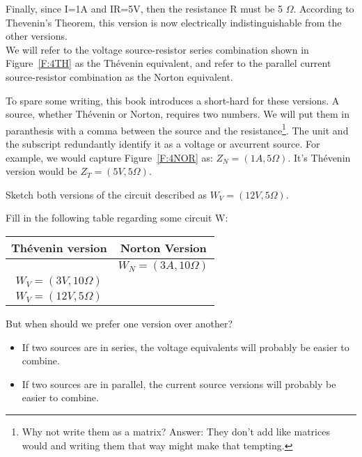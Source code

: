 Finally, since I=1A and IR=5V, then the resistance R must be 5 $\Omega$. According to Thevenin's Theorem, this version is now electrically indistinguishable from the other versions.
\\

We will refer to the voltage source-resistor series combination shown in Figure~\ref{F:4TH} as the Th\'{e}venin equivalent, and refer to the parallel current source-resistor combination as the Norton equivalent. 
\par
To spare some writing, this book introduces a short-hard for these versions. A source, whether Th\'{e}venin or Norton, requires two numbers. We will put them in paranthesis with a comma between the source and the resistance\footnote{Why not write them as a matrix? Answer: They don't add like matrices would and writing them that way might make that tempting.}. The unit and the subscript redundantly identify it as a voltage or avcurrent source. For example, we would capture Figure~\ref{F:4NOR} as: $Z_N=(1A,5\Omega)$. It's Th\'{e}venin version would be $Z_T=(5V,5\Omega)$.
\par
\begin{alevel}
Sketch both versions of the circuit described as $W_V=(12V,5\Omega)$. 
\end{alevel}

\begin{blevel}
Fill in the following table regarding some circuit W:
\begin{table}[H]
\begin{center}
\begin{tabular}{|c|c|} \hline
Th\'{e}venin version & Norton Version \\ \hline
&$W_N=(3A,10\Omega)$ \\ \hline
$W_V=(3V,10\Omega)$& \\ \hline
$W_V=(12V,5\Omega)$& \\ \hline
\end{tabular}
\end{center}
\end{table}
\end{blevel}


But when should we prefer one version over another?
\begin{itemize}
\item If two sources are in series, the voltage equivalents will probably be easier to combine.
\item If two sources are in parallel, the current source versions will probably be easier to combine.
\end{itemize}


